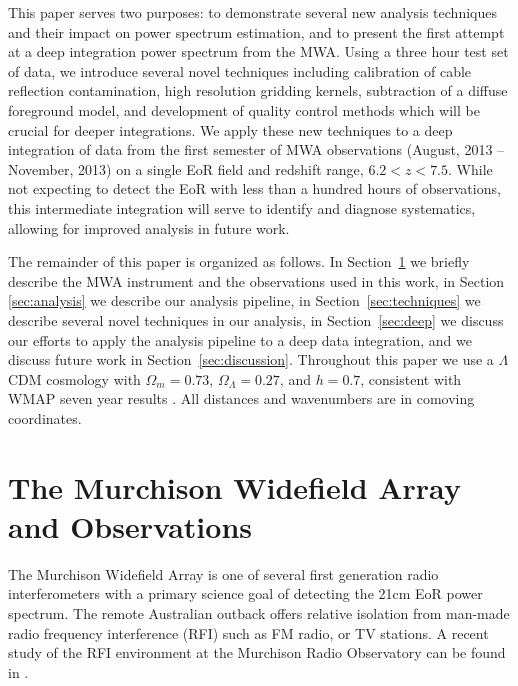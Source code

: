 \documentclass[iop]{emulateapj}
\begin{document}
This paper serves two purposes: to demonstrate several new analysis techniques and their 
impact on power spectrum estimation, and to present the first attempt at a deep integration 
power spectrum from the MWA. Using a three hour test set of data, we introduce several 
novel techniques including calibration of cable reflection contamination, high resolution 
gridding kernels, subtraction of a diffuse foreground model, and development of quality 
control methods which will be crucial for deeper integrations. We apply these new 
techniques to a deep integration of data from the first semester of MWA observations 
(August, 2013 -- November, 2013) on a single EoR field and redshift range, $6.2<z<7.5$. 
While not expecting to detect the EoR with less than a hundred hours of observations, this 
intermediate integration will serve to identify and diagnose systematics, allowing for 
improved analysis in future work.

The remainder of this paper is organized as follows. In Section~\ref{sec:MWA} we briefly 
describe the MWA instrument and the observations used in this work, in Section~
\ref{sec:analysis} we describe our analysis pipeline, in Section~\ref{sec:techniques} we 
describe several novel techniques in our analysis, in Section~\ref{sec:deep} we discuss our 
efforts to apply the analysis pipeline to a deep data integration, and we discuss future work 
in Section~\ref{sec:discussion}. Throughout this paper we use a $\Lambda$CDM 
cosmology with $\Omega_m=0.73$, $\Omega_\Lambda=0.27$, and $h = 0.7$, consistent 
with WMAP seven year results \citep{Komatsu:2011}. All distances and wavenumbers are in 
comoving coordinates.

\section{The Murchison Widefield Array and Observations}\label{sec:MWA}
The Murchison Widefield Array is one of several first generation radio interferometers with 
a primary science goal of detecting the 21cm EoR power spectrum. The remote Australian 
outback offers relative isolation from man-made radio frequency interference (RFI) such as 
FM radio, or TV stations. A recent study of the RFI environment at the Murchison Radio 
Observatory can be found in \citealt{Offringa:2015}.
\end{document}
